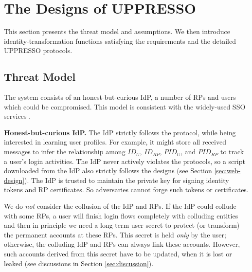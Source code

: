 
\section{The Designs of UPPRESSO}
\label{sec:UPPRESSO}

This section presents the threat model and assumptions.
We then introduce identity-transformation functions satisfying the requirements
    and the detailed UPPRESSO protocols.


\subsection{Threat Model}
The system consists of an honest-but-curious IdP, a number of RPs and users which could be compromised. %
This model is consistent with the widely-used SSO services \cite{OpenIDConnect,rfc6749,SAML,SAMLIdentifier,NIST2017draft}.


\noindent \textbf{Honest-but-curious IdP.}
The IdP strictly follows the protocol, while being interested in learning user profiles.
For example, it might store all received messages
 to infer the relationship among $ID_U$, $ID_{RP}$, $PID_{U}$, and $PID_{RP}$ to track a user's login activities.
The IdP never actively violates the protocols,
so a script downloaded from the IdP also strictly follows the designs (see Section \ref{sec:web-design}).
The IdP is trusted to maintain the private key for signing identity tokens and RP certificates. %
So adversaries cannot forge such tokens or certificates.

We do \emph{not} consider the collusion of the IdP and RPs.
    If the IdP could collude with some RPs,
        a user will finish login flows completely with colluding entities
        and then in principle we need a long-term user secret to protect (or transform) the permanent accounts at these RPs.
This secret is held \emph{only} by the user;
    otherwise, the colluding IdP and RPs can always link these accounts.
However, such accounts derived from this secret have to be updated,
    when it is lost or leaked
    (see discussions in Section \ref{sec:discussion}).

